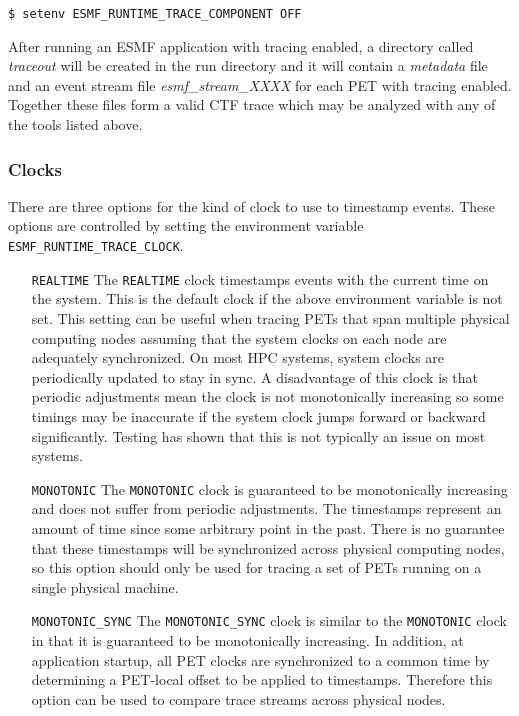 \begin{verbatim}
$ setenv ESMF_RUNTIME_TRACE_COMPONENT OFF
\end{verbatim}

After running an ESMF application with tracing enabled, a directory
called {\em traceout} will be created in the run directory and it will
contain a {\em metadata} file and an event stream file {\em esmf\_stream\_XXXX}
for each PET with tracing enabled. Together these files form a valid
CTF trace which may be analyzed with any of the tools listed above.

\subsubsection{Clocks}
\label{sec:TracingClocks}

There are three options for the kind of clock to use to timestamp
events. These options are controlled by setting the environment variable
{\tt ESMF\_RUNTIME\_TRACE\_CLOCK}.
\begin{itemize}
\item [{\tt REALTIME}] The {\tt REALTIME} clock timestamps events with the current time on
      the system.  This is the default clock if the above environment
      variable is not set.  This setting can be useful when tracing PETs that
      span multiple physical computing nodes assuming that the system clocks
      on each node are adequately synchronized.  On most HPC systems, system
      clocks are periodically updated to stay in sync.  A disadvantage of this
      clock is that periodic adjustments mean the clock is not monotonically
      increasing so some timings may be inaccurate if the system clock jumps
      forward or backward significantly. Testing has shown that this is not
      typically an issue on most systems.
\item [{\tt MONOTONIC}] The {\tt MONOTONIC} clock is guaranteed to be monotonically increasing
      and does not suffer from periodic adjustments.  The timestamps represent
      an amount of time since some arbitrary point in the past.  There is no
      guarantee that these timestamps will be synchronized across physical
      computing nodes, so this option should only be used for tracing a set of PETs
      running on a single physical machine.
\item [{\tt MONOTONIC\_SYNC}] The {\tt MONOTONIC\_SYNC} clock is similar to the {\tt MONOTONIC} clock
      in that it is guaranteed to be monotonically increasing. In addition, at
      application startup, all PET clocks are synchronized to a common time
      by determining a PET-local offset to be applied to timestamps. Therefore this option
      can be used to compare trace streams across physical nodes.     
\end{itemize}
